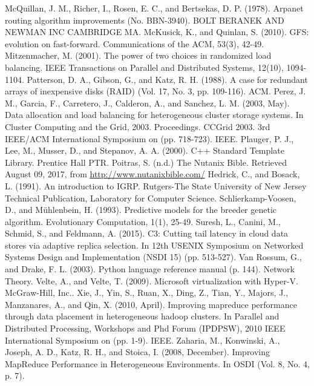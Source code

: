 \documentclass[12pt]{article}
\begin{document}
\begin{thebibliography}{99}
   McQuillan, J. M., Richer, I., Rosen, E. C., and Bertsekas, D. P. (1978). Arpanet routing algorithm improvements (No. BBN-3940). BOLT BERANEK AND NEWMAN INC CAMBRIDGE MA.
   McKusick, K., and Quinlan, S. (2010). GFS: evolution on fast-forward. Communications of the ACM, 53(3), 42-49.
   Mitzenmacher, M. (2001). The power of two choices in randomized load balancing. IEEE Transactions on Parallel and Distributed Systems, 12(10), 1094-1104.
   Patterson, D. A., Gibson, G., and Katz, R. H. (1988). A case for redundant arrays of inexpensive disks (RAID) (Vol. 17, No. 3, pp.  109-116). ACM.
   Perez, J. M., Garcia, F., Carretero, J., Calderon, A., and Sanchez, L. M. (2003, May). Data allocation and load balancing for heterogeneous cluster storage systems. In Cluster Computing and the Grid, 2003. Proceedings. CCGrid 2003. 3rd IEEE/ACM International Symposium on (pp. 718-723). IEEE.
   Plauger, P. J., Lee, M., Musser, D., and Stepanov, A. A. (2000). C++ Standard Template Library. Prentice Hall PTR.
   Poitras, S. (n.d.) The Nutanix Bible. Retrieved August 09, 2017, from \url{http://www.nutanixbible.com/}
   Hedrick, C., and Bosack, L. (1991). An introduction to IGRP. Rutgers-The State University of New Jersey Technical Publication, Laboratory for Computer Science.
   Schlierkamp-Voosen, D., and Mühlenbein, H. (1993). Predictive models for the breeder genetic algorithm. Evolutionary Computation, 1(1), 25-49.
   Suresh, L., Canini, M., Schmid, S., and Feldmann, A. (2015). C3: Cutting tail latency in cloud data stores via adaptive replica selection. In 12th USENIX Symposium on Networked Systems Design and Implementation (NSDI 15) (pp. 513-527).
   Van Rossum, G., and Drake, F. L. (2003). Python language reference manual (p. 144). Network Theory.
   Velte, A., and Velte, T. (2009). Microsoft virtualization with Hyper-V. McGraw-Hill, Inc..
   Xie, J., Yin, S., Ruan, X., Ding, Z., Tian, Y., Majors, J., Manzanares, A., and Qin, X. (2010, April). Improving mapreduce performance through data placement in heterogeneous hadoop clusters. In Parallel and Distributed Processing, Workshops and Phd Forum (IPDPSW), 2010 IEEE International Symposium on (pp. 1-9). IEEE.
   Zaharia, M., Konwinski, A., Joseph, A. D., Katz, R.  H., and Stoica, I. (2008, December). Improving MapReduce Performance in Heterogeneous Environments. In OSDI (Vol. 8, No. 4, p. 7).


 \end{thebibliography}
\end{document}
